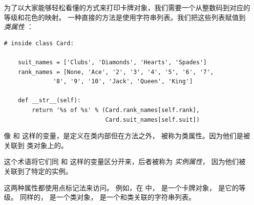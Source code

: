 \label{class.attribute}
  


为了以大家能够轻松看懂的方式来打印卡牌对象，我们需要一个从整数码到对应的等级和花色的映射。
一种直接的方法是使用字符串列表。我们把这些列表赋值到 {\em 类属性} ：

\begin{lstlisting}
# inside class Card:

    suit_names = ['Clubs', 'Diamonds', 'Hearts', 'Spades']
    rank_names = [None, 'Ace', '2', '3', '4', '5', '6', '7',
              '8', '9', '10', 'Jack', 'Queen', 'King']

    def __str__(self):
        return '%s of %s' % (Card.rank_names[self.rank],
                             Card.suit_names[self.suit])
\end{lstlisting}


像  和  这样的变量，是定义在类内部但在方法之外，
被称为类属性。因为他们是被关联到  类对象上的。

  


这个术语将它们同  和  这样的变量区分开来，后者被称为 {\em 实例属性}，
因为他们被关联到了特定的实例。


这两种属性都使用点标记法来访问。
例如，在  中，  是一个卡牌对象，  是它的等级。
同样的，  是一个类对象，  是一个和类关联的字符串列表。

